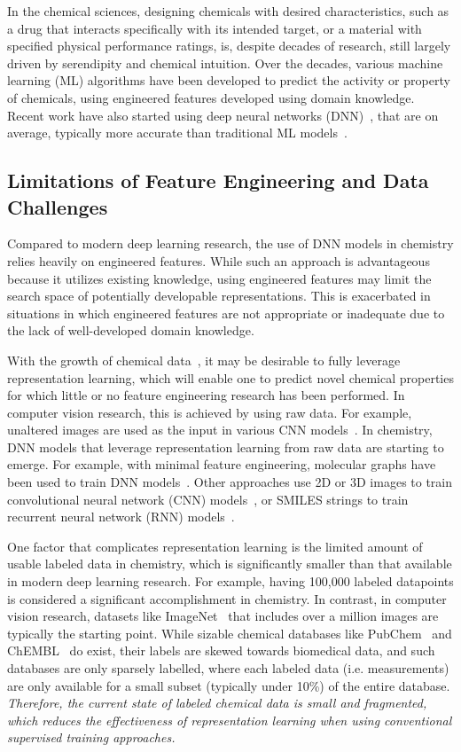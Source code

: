 \documentclass[sigconf]{acmart}
\begin{document}
In the chemical sciences, designing chemicals with desired characteristics, such as a drug that interacts specifically with its intended target, or a material with specified physical performance ratings, is, despite decades of research, still largely driven by serendipity and chemical intuition. Over the decades, various machine learning (ML) algorithms have been developed to predict the activity or property of chemicals, using engineered features developed using domain knowledge. Recent work have also started using deep neural networks (DNN)~\cite{dahl2014, mayr2016, ramsundar2015, hughes2016}, that are on average, typically more accurate than traditional ML models~\cite{gawehn2016, goh2017r}.

\subsection{Limitations of Feature Engineering and Data Challenges}
Compared to modern deep learning research, the use of DNN models in chemistry relies heavily on engineered features. While such an approach is advantageous because it utilizes existing knowledge, using engineered features may limit the search space of potentially developable representations. This is exacerbated in situations in which engineered features are not appropriate or inadequate due to the lack of well-developed domain knowledge.

With the growth of chemical data~\cite{goh2017r}, it may be desirable to fully leverage representation learning, which will enable one to predict novel chemical properties for which little or no feature engineering research has been performed. In computer vision research, this is achieved by using raw data. For example, unaltered images are used as the input in various CNN models~\cite{szegedy2015,he2015}. In chemistry, DNN models that leverage representation learning from raw data are starting to emerge. For example, with minimal feature engineering, molecular graphs have been used to train DNN models~\cite{duvenaud2015, kearnes2016}. Other approaches use 2D or 3D images to train convolutional neural network (CNN) models~\cite{goh2017c1, goh2017c2, wallach2015}, or SMILES strings to train recurrent neural network (RNN) models~\cite{bjerrum2017, goh2017s}.

One factor that complicates representation learning is the limited amount of usable labeled data in chemistry, which is significantly smaller than that available in modern deep learning research. For example, having 100,000 labeled datapoints is considered a significant accomplishment in chemistry. In contrast, in computer vision research, datasets like ImageNet~\cite{russakovsky2015} that includes over a million images are typically the starting point. While sizable chemical databases like PubChem~\cite{kim2015} and ChEMBL~\cite{gaulton2011} do exist, their labels are skewed towards biomedical data, and such databases are only sparsely labelled, where each labeled data (i.e. measurements) are only available for a small subset (typically under 10\%) of the entire database. \textit{Therefore, the current state of labeled chemical data is small and fragmented, which reduces the effectiveness of representation learning when using conventional supervised training approaches.}
\end{document}
